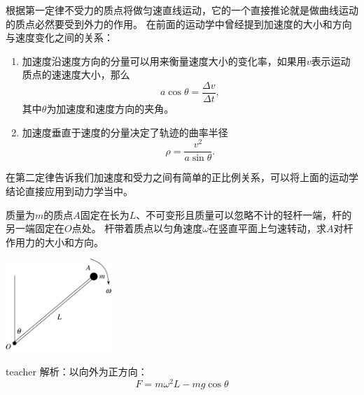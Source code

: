根据第一定律不受力的质点将做匀速直线运动，它的一个直接推论就是做曲线运动的质点必然要受到外力的作用。
在前面的运动学中曾经提到加速度的大小和方向与速度变化之间的关系：
\begin{enumerate}
	\item 加速度沿速度方向的分量可以用来衡量速度大小的变化率，如果用$v$表示运动质点的速速度大小，那么
	\begin{equation}
	a\cos\theta = \frac{\Delta v}{\Delta t},
	\end{equation}
	其中$\theta$为加速度和速度方向的夹角。
	\item 加速度垂直于速度的分量决定了轨迹的曲率半径
	\begin{equation}\label{key}
	\rho = \frac{v^2}{a\sin\theta}.
	\end{equation}
\end{enumerate}
在第二定律告诉我们加速度和受力之间有简单的正比例关系，可以将上面的运动学结论直接应用到动力学当中。

\begin{example}
质量为$m$的质点$A$固定在长为$L$、不可变形且质量可以忽略不计的轻杆一端，杆的另一端固定在$O$点处。
杆带着质点以匀角速度$ \omega$在竖直平面上匀速转动，求$A$对杆作用力的大小和方向。
\begin{flushright}
\includegraphics[width=0.3\textwidth]{images/newton-problem-2.pdf}
\end{flushright}
\begin{taggedblock}{teacher}
\noindent
解析：以向外为正方向：
\[F=m\omega^2L-mg\cos\theta\]
\end{taggedblock}
\end{example}













%


